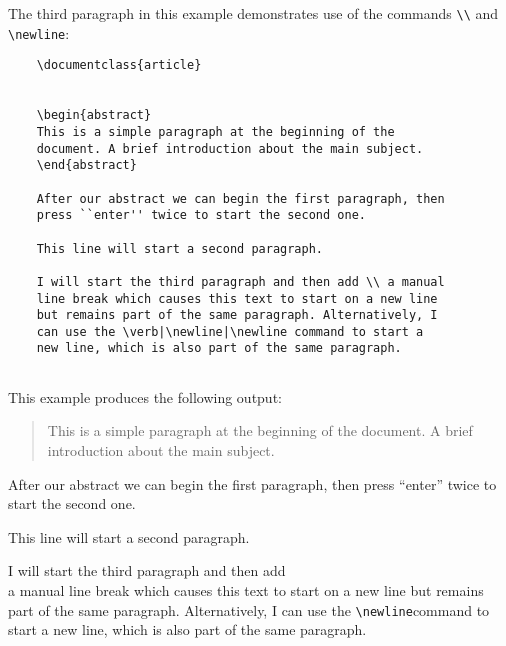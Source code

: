 The third paragraph in this example demonstrates use of the commands \verb|\\| and \verb|\newline|:

\begin{tcolorbox}
\begin{verbatim}
    \documentclass{article}
    

    \begin{abstract}
    This is a simple paragraph at the beginning of the 
    document. A brief introduction about the main subject.
    \end{abstract}

    After our abstract we can begin the first paragraph, then 
    press ``enter'' twice to start the second one.

    This line will start a second paragraph.

    I will start the third paragraph and then add \\ a manual 
    line break which causes this text to start on a new line 
    but remains part of the same paragraph. Alternatively, I 
    can use the \verb|\newline|\newline command to start a 
    new line, which is also part of the same paragraph.
    
\end{verbatim}
\end{tcolorbox}

This example produces the following output:

\begin{mdframed}
    \begin{abstract}
    This is a simple paragraph at the beginning of the document. A brief introduction about the main subject.
    \end{abstract}

    \-\hspace{20pt}After our abstract we can begin the first paragraph, then press ``enter'' twice to start the second one.

    \-\hspace{20pt}This line will start a second paragraph.

    \-\hspace{20pt}I will start the third paragraph and then add \\ a manual line break which causes this text to start on a new line but remains part of the same paragraph. Alternatively, I can use the \verb|\newline|\newline command to start a new line, which is also part of the same paragraph.
\end{mdframed}

